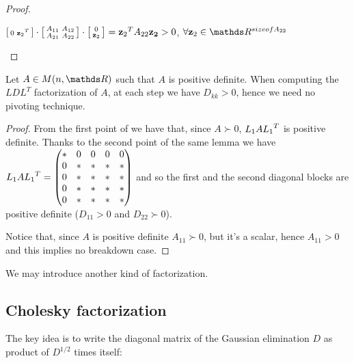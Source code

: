 \documentclass[ComputationalMathematics.tex]{subfiles}
\begin{document}
\begin{proof}
\begin{enumerate}
\begin{description}
      $\begin{bsmallmatrix}
        0& {\mathbf{z}_2}^{T}\\
      \end{bsmallmatrix} 
      \cdot 
      \begin{bsmallmatrix}
	      A_{11} & A_{12}\\
	      A_{21} & A_{22}
      \end{bsmallmatrix}
      \cdot 
      \begin{bsmallmatrix}
        0\\\mathbf{z}_2
      \end{bsmallmatrix}
      = {\mathbf{z}_2}^{T} A_{22} \mathbf{z_2} > 0$, $\forall \mathbf{z}_2 \in \R^{size of A_{22}}$
 
  \end{description}
   \end{enumerate}
\end{proof}

\begin{corollary}
  Let $A \in M(n, \R)$ such that $A$ is positive definite. When computing the $LDL^T$ factorization of $A$, at each step we have $D_{kk}>0$, hence we need no pivoting technique.
\end{corollary}

\begin{proof}
  From the first point of  we have that, since $A {\succ} 0$, $L_1 A {L_1}^{T}$ is positive definite. Thanks to the second point of the same lemma we have $L_1 A {L_1}^{T} = 
\begin{pmatrix}
    \ast & 0 & 0 & 0 & 0\\
    0 & \ast & \ast & \ast & \ast\\
    0 & \ast & \ast & \ast & \ast\\
    0 & \ast & \ast & \ast & \ast\\
    0 & \ast & \ast & \ast & \ast\\
\end{pmatrix}$ and so the first and the second diagonal blocks are positive definite ($D_{11} > 0$ and $D_{22} {\succ} 0$).

  Notice that, since $A$ is positive definite $A_{11} {\succ} 0$, but it's a scalar, hence $A_{11} > 0$ and this implies no breakdown case.
\end{proof}

We may introduce another kind of factorization.

\subsection{Cholesky factorization}
The key idea is to write the diagonal matrix of the Gaussian elimination $D$ as product of $D^{1/2}$ times itself:
\end{document}
